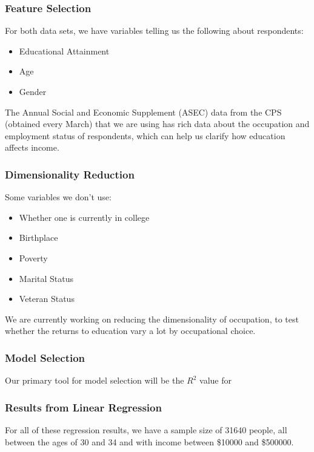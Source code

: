 \documentclass{beamer}
\let\olditem=\item
\renewcommand{\item}{\olditem \justifying}
\begin{document}
\frame %
{
  \frametitle{Feature Selection}
  For both data sets, we have variables telling us the following about respondents:
  \begin{itemize}
  \item Educational Attainment
  \item Age
  \item Gender
  \end{itemize}
  
  The Annual Social and Economic Supplement (ASEC) data from the CPS (obtained every March) that we are using has rich data about the occupation and employment status of respondents, which can help us clarify how education affects income.
}


\frame %
{
  \frametitle{Dimensionality Reduction}
  

Some variables we don't use:
\begin{itemize}
\item Whether one is currently in college
\item Birthplace 
\item Poverty 
\item Marital Status
\item Veteran Status
\end{itemize}

  We are currently working on reducing the dimensionality of occupation, to test whether the returns to education vary a lot by occupational choice.
 
  
  }
  

  

  



\frame %
{
  \frametitle{Model Selection}
Our primary tool for model selection will be the $R^2$ value for 
  
  
  
  }
  
  \frame %
  {
  \frametitle{Results from Linear Regression}
  \begin{Large}
  
  \end{Large}

\vspace{16pt}

  For all of these regression results, we have a sample size of 31640 people, all between the ages of 30 and 34 and with income between \$10000 and \$500000.
  
  }
  
\end{document}
